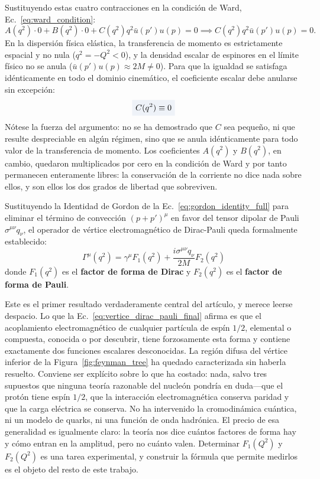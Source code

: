 \documentclass[10pt,a4paper]{article}
\newcommand{\dest}[1]{{\setlength{\fboxsep}{4pt}\colorbox{colordest}{$\displaystyle #1$}}}
\begin{document}
Sustituyendo estas cuatro contracciones en la condición de Ward, Ec.~\eqref{eq:ward_condition}:
\begin{equation}
A(q^2) \cdot 0 + B(q^2) \cdot 0 + C(q^2) q^2 \bar{u}(p') u(p) = 0 \implies C(q^2) q^2 \bar{u}(p') u(p) = 0.
\end{equation}
En la dispersión física elástica, la transferencia de momento es estrictamente espacial y no nula ($q^2 = -Q^2 < 0$), y la densidad escalar de espinores en el límite físico no se anula ($\bar{u}(p') u(p) \approx 2M \neq 0$). Para que la igualdad se satisfaga idénticamente en todo el dominio cinemático, el coeficiente escalar debe anularse sin excepción:
\begin{equation}
\dest{C(q^2) \equiv 0}
\label{eq:C_zero_exact}
\end{equation}
Nótese la fuerza del argumento: no se ha demostrado que $C$ sea pequeño, ni que resulte despreciable en algún régimen, sino que se anula idénticamente para todo valor de la transferencia de momento. Los coeficientes $A(q^2)$ y $B(q^2)$, en cambio, quedaron multiplicados por cero en la condición de Ward y por tanto permanecen enteramente libres: la conservación de la corriente no dice nada sobre ellos, y son ellos los dos grados de libertad que sobreviven.

Sustituyendo la Identidad de Gordon de la Ec.~\eqref{eq:gordon_identity_full} para eliminar el término de convección $(p+p')^\mu$ en favor del tensor dipolar de Pauli $\sigma^{\mu\nu} q_\nu$, el operador de vértice electromagnético de Dirac-Pauli queda formalmente establecido:
\begin{equation}
\boxed{\Gamma^\mu(q^2) = \gamma^\mu F_1(q^2) + \frac{i \sigma^{\mu\nu} q_\nu}{2M} F_2(q^2)}
\label{eq:vertice_dirac_pauli_final}
\end{equation}
donde $F_1(q^2)$ es el \textbf{factor de forma de Dirac} y $F_2(q^2)$ es el \textbf{factor de forma de Pauli}.

Este es el primer resultado verdaderamente central del artículo, y merece leerse despacio. Lo que la Ec.~\eqref{eq:vertice_dirac_pauli_final} afirma es que el acoplamiento electromagnético de cualquier partícula de espín $1/2$, elemental o compuesta, conocida o por descubrir, tiene forzosamente esta forma y contiene exactamente dos funciones escalares desconocidas. La región difusa del vértice inferior de la Figura~\ref{fig:feynman_tree} ha quedado caracterizada sin haberla resuelto. Conviene ser explícito sobre lo que ha costado: nada, salvo tres supuestos que ninguna teoría razonable del nucleón pondría en duda---que el protón tiene espín $1/2$, que la interacción electromagnética conserva paridad y que la carga eléctrica se conserva. No ha intervenido la cromodinámica cuántica, ni un modelo de quarks, ni una función de onda hadrónica. El precio de esa generalidad es igualmente claro: la teoría nos dice cuántos factores de forma hay y cómo entran en la amplitud, pero no cuánto valen. Determinar $F_1(Q^2)$ y $F_2(Q^2)$ es una tarea experimental, y construir la fórmula que permite medirlos es el objeto del resto de este trabajo.
\end{document}
